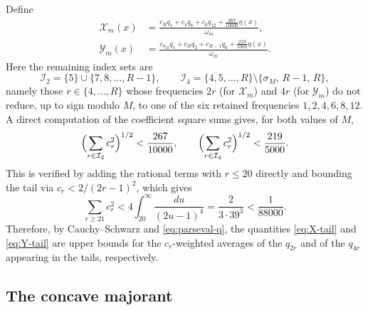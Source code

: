 \documentclass[11pt]{article}
\theoremstyle{definition}
\theoremstyle{remark}
\numberwithin{equation}{section}
\newcommand{\cX}{\mathcal X}
\newcommand{\cY}{\mathcal Y}
\begin{document}
Define
\begin{align}
 \cX_m(x)&=
 \frac{c_Rq_1+c_4q_8+c_6q_{12}+\frac{267}{10000}\eta(x)}{\omega_m},
 \label{eq:X-tail}\\
 \cY_m(x)&=
 \frac{c_{\sigma_M}q_1+c_Rq_2+c_{R-1}q_6+\frac{219}{5000}\eta(x)}{\omega_m}.
 \label{eq:Y-tail}
\end{align}
Here the remaining index sets are
\[
  \mathcal I_2=\{5\}\cup\{7,8,\ldots,R-1\},
  \qquad
  \mathcal I_4=\{4,5,\ldots,R\}\setminus\{\sigma_M,\,R-1,\,R\},
\]
namely those $r\in\{4,\ldots,R\}$ whose frequencies $2r$ (for $\cX_m$) and $4r$ (for $\cY_m$) do not reduce, up to sign modulo $M$, to one of the six retained frequencies $1,2,4,6,8,12$. A direct computation of the coefficient square sums gives, for both values of $M$,
\[
  \Bigl(\sum_{r\in\mathcal I_2}c_r^2\Bigr)^{1/2}<\frac{267}{10000},
  \qquad
  \Bigl(\sum_{r\in\mathcal I_4}c_r^2\Bigr)^{1/2}<\frac{219}{5000}.
\]
This is verified by adding the rational terms with $r\le20$ directly and bounding the tail via $c_r<2/(2r-1)^2$, which gives
\[
  \sum_{r\ge21}c_r^2
  <4\int_{20}^{\infty}\frac{du}{(2u-1)^4}
  =\frac{2}{3\cdot39^{3}}
  <\frac1{88000}.
\]
Therefore, by Cauchy--Schwarz and \eqref{eq:parseval-q}, the quantities \eqref{eq:X-tail} and \eqref{eq:Y-tail} are upper bounds for the $c_r$-weighted averages of the $q_{2r}$ and of the $q_{4r}$ appearing in the tails, respectively.

\subsection{The concave majorant}
\end{document}
